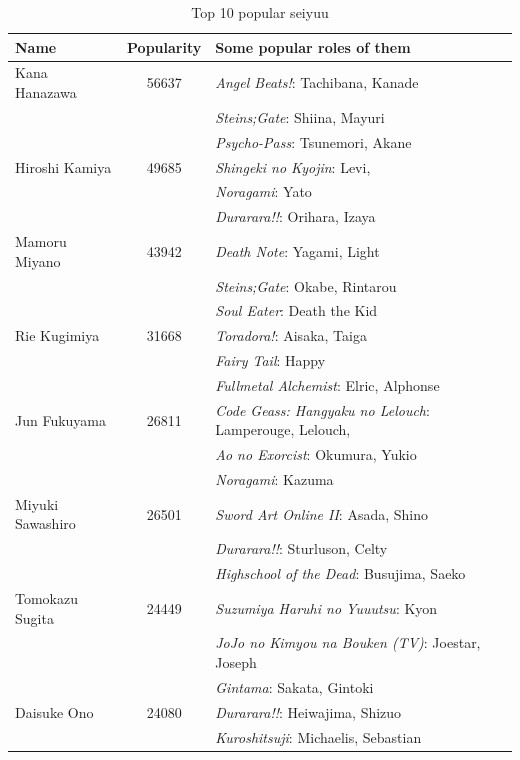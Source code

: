 \begin{table}[!h]
	\begin{center}
	\caption{Top 10 popular seiyuu}
	\label{tab:top10Popularity}
	\begin{tabular}{|l|c|l|}
		\hline
		Name & Popularity & Some popular roles of them\\ 
		\hline
		Kana Hanazawa & 56637 & \textit{Angel Beats!}: Tachibana, Kanade \\ 
		 & & \textit{Steins;Gate}: Shiina, Mayuri \\ 
		 & & \textit{Psycho-Pass}: Tsunemori, Akane \\
		\hline
		Hiroshi Kamiya & 49685 & \textit{Shingeki no Kyojin}: Levi, \\ 
		 & & \textit{Noragami}: Yato \\ 
		 & & \textit{Durarara!!}: Orihara, Izaya \\ 
		\hline
		Mamoru Miyano & 43942 & \textit{Death Note}: Yagami, Light \\ 
		 & & \textit{Steins;Gate}: Okabe, Rintarou \\ 
		 & & \textit{Soul Eater}: Death the Kid \\ 
		\hline
		Rie Kugimiya & 31668 & \textit{Toradora!}: Aisaka, Taiga \\ 
		 & & \textit{Fairy Tail}: Happy \\ 
		 & & \textit{Fullmetal Alchemist}: Elric, Alphonse \\
		\hline
		Jun Fukuyama & 26811 & \textit{Code Geass: Hangyaku no Lelouch}: Lamperouge, Lelouch, \\ 
		 & & \textit{Ao no Exorcist}: Okumura, Yukio \\ 
		 & & \textit{Noragami}: Kazuma \\ 
		\hline
		Miyuki Sawashiro & 26501 & \textit{Sword Art Online II}: Asada, Shino \\ 
		 & & \textit{Durarara!!}: Sturluson, Celty \\ 
		 & & \textit{Highschool of the Dead}: Busujima, Saeko \\
		\hline
		Tomokazu Sugita & 24449 & \textit{Suzumiya Haruhi no Yuuutsu}: Kyon \\
		 & & \textit{JoJo no Kimyou na Bouken (TV)}: Joestar, Joseph \\ 
		 & & \textit{Gintama}: Sakata, Gintoki \\
		\hline
		Daisuke Ono & 24080 & \textit{Durarara!!}: Heiwajima, Shizuo \\ 
		 & & \textit{Kuroshitsuji}: Michaelis, Sebastian \\ 

\end{tabular}
\end{center}
\end{table}
